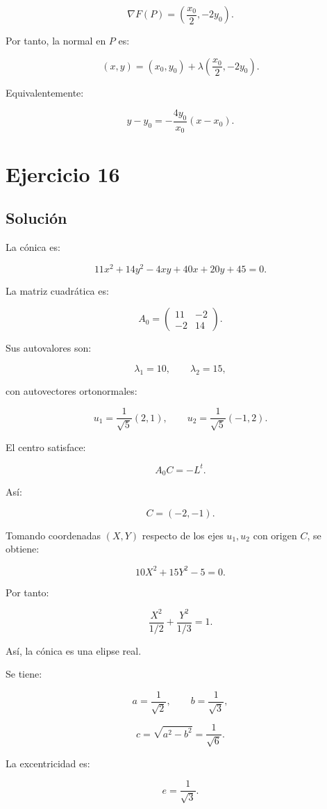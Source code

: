 \documentclass[11pt,a4paper]{article}
\begin{document}
\[
\nabla F(P)
=
\left(
\frac{x_0}{2},
-2y_0
\right).
\]

Por tanto, la normal en \(P\) es:

\[
\boxed{
(x,y)
=
(x_0,y_0)
+
\lambda
\left(
\frac{x_0}{2},
-2y_0
\right).
}
\]

Equivalentemente:

\[
\boxed{
y-y_0
=
-\frac{4y_0}{x_0}(x-x_0).
}
\]

\section{Ejercicio 16}
\subsection{Solución}

La cónica es:

\[
11x^2+14y^2-4xy+40x+20y+45=0.
\]

La matriz cuadrática es:

\[
A_0=
\begin{pmatrix}
11&-2\\
-2&14
\end{pmatrix}.
\]

Sus autovalores son:

\[
\lambda_1=10,
\qquad
\lambda_2=15,
\]

con autovectores ortonormales:

\[
u_1=
\frac1{\sqrt5}(2,1),
\qquad
u_2=
\frac1{\sqrt5}(-1,2).
\]

El centro satisface:

\[
A_0C=-L^t.
\]

Así:

\[
\boxed{
C=(-2,-1).
}
\]

Tomando coordenadas \((X,Y)\) respecto de los ejes \(u_1,u_2\) con origen \(C\), se obtiene:

\[
10X^2+15Y^2-5=0.
\]

Por tanto:

\[
\boxed{
\frac{X^2}{1/2}
+
\frac{Y^2}{1/3}
=
1.
}
\]

Así, la cónica es una elipse real.

Se tiene:

\[
a=\frac1{\sqrt2},
\qquad
b=\frac1{\sqrt3},
\]

\[
c=
\sqrt{a^2-b^2}
=
\frac1{\sqrt6}.
\]

La excentricidad es:

\[
\boxed{
e=\frac1{\sqrt3}.
}
\]
\end{document}
